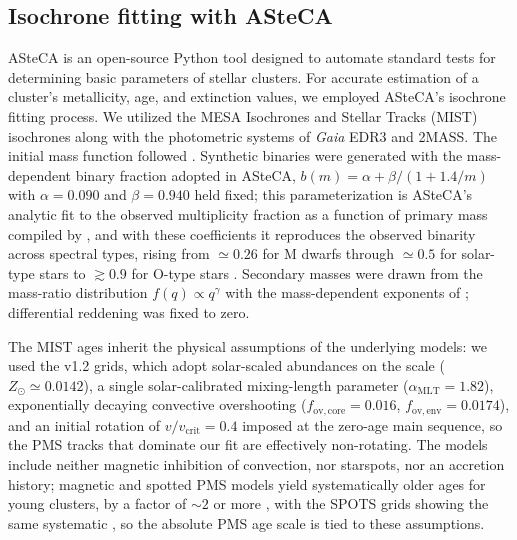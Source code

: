 \documentclass{aa}
\begin{document}
\subsection{Isochrone fitting with ASteCA}\label{subsec:asteca}
ASteCA \citep{2015A&A...576A...6P} is an open-source Python tool designed to automate standard tests for determining basic parameters of stellar clusters. For accurate estimation of a cluster's metallicity, age, and extinction values, we employed ASteCA's isochrone fitting process. We utilized the MESA Isochrones and Stellar Tracks (MIST) isochrones \citep{2016ApJS..222....8D, 2016ApJ...823..102C} along with the photometric systems of \textit{Gaia} EDR3 and 2MASS\@. The initial mass function followed \citet{2014ApJ...796...75C}. Synthetic binaries were generated with the mass-dependent binary fraction adopted in ASteCA, $b(m)=\alpha+\beta/(1+1.4/m)$ with $\alpha=0.090$ and $\beta=0.940$ held fixed; this parameterization is ASteCA's analytic fit to the observed multiplicity fraction as a function of primary mass compiled by \citet{2023ASPC..534..275O}, and with these coefficients it reproduces the observed binarity across spectral types, rising from $\simeq0.26$ for M dwarfs through $\simeq0.5$ for solar-type stars to $\gtrsim0.9$ for O-type stars \citep{2013ARA&A..51..269D,2017ApJS..230...15M}. Secondary masses were drawn from the mass-ratio distribution $f(q)\propto q^{\gamma}$ with the mass-dependent exponents of \citet{2013ARA&A..51..269D}; differential reddening was fixed to zero.

The MIST ages inherit the physical assumptions of the underlying models: we used the v1.2 grids, which adopt solar-scaled abundances on the \citet{2009ARA&A..47..481A} scale ($Z_\odot\simeq0.0142$), a single solar-calibrated mixing-length parameter ($\alpha_{\mathrm{MLT}}=1.82$), exponentially decaying convective overshooting ($f_{\mathrm{ov,core}}=0.016$, $f_{\mathrm{ov,env}}=0.0174$), and an initial rotation of $v/v_{\mathrm{crit}}=0.4$ imposed at the zero-age main sequence, so the PMS tracks that dominate our fit are effectively non-rotating. The models include neither magnetic inhibition of convection, nor starspots, nor an accretion history; magnetic and spotted PMS models yield systematically older ages for young clusters, by a factor of $\sim2$ or more \citep{2016A&A...593A..99F,2015ApJ...807..174S}, with the SPOTS grids showing the same systematic \citep{2020ApJ...891...29S}, so the absolute PMS age scale is tied to these assumptions.
\end{document}
